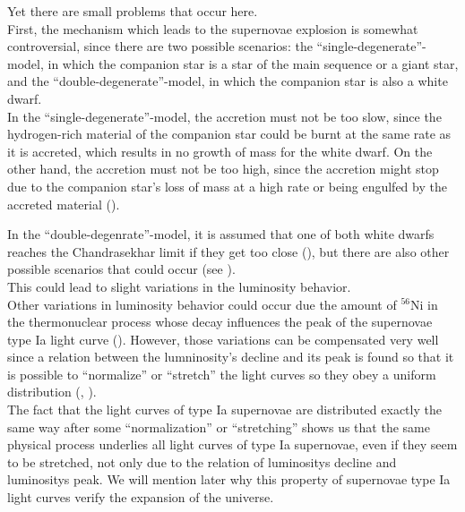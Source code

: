 \noindent Yet there are small problems that occur here. \\
First, the mechanism which leads to the supernovae explosion is somewhat controversial, since there are two possible scenarios: the ``single-degenerate''-model, in which the companion star is a star of the main sequence or a giant star, and the ``double-degenerate''-model, in which the companion star is also a white dwarf. \\

\noindent In the ``single-degenerate''-model, the accretion must not be too slow, since the hydrogen-rich material of the companion star could be burnt at the same rate as it is accreted, which results in no growth of mass for the white dwarf. On the other hand, the accretion must not be too high, since the accretion might stop due to the companion star's loss of mass at a high rate or being engulfed by the accreted material (\cite[p.~308]{Maguire2017}).

\noindent In the ``double-degenrate''-model, it is assumed that one of both white dwarfs reaches the Chandrasekhar limit if they get too close (\cite[p.~48]{Bartelmann2019}), but there are also other possible scenarios that could occur (see \cite[p.~308/309]{Maguire2017}). \\
\noindent This could lead to slight variations in the luminosity behavior. \\


\noindent Other variations in luminosity behavior could occur due the amount of $^{56}$Ni in the thermonuclear process whose decay influences the peak of the supernovae type Ia light curve (\cite[p.~295]{Maguire2017}). However, those variations can be compensated very well since a relation between the lumninosity's decline and its peak is found so that it is possible to ``normalize'' or ``stretch'' the light curves so they obey a uniform distribution (\cite[p.~4]{Perlmutter2003}, \cite{Phillips1993}).\\
The fact that the light curves of type Ia supernovae are distributed exactly the same way after some ``normalization'' or ``stretching'' shows us that the same physical process underlies all light curves of type Ia supernovae, even if they seem to be stretched, not only due to the relation of luminositys decline and luminositys peak. We will mention later why this property of supernovae type Ia light curves verify the expansion of the universe.

